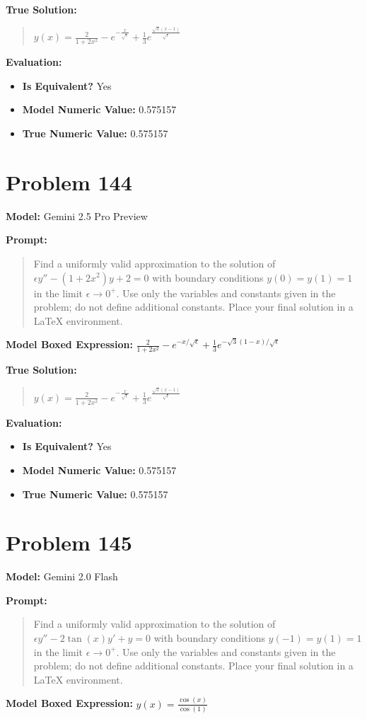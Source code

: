 \documentclass{article}
\begin{document}
{\textbf{True Solution:}
\begin{quote}
$y(x)=\frac{2}{1+2x^2}-e^{-\frac{x}{\sqrt{\epsilon}}}+\frac{1}{3}e^{\frac{\sqrt{3}(x-1)}{\sqrt{\epsilon}}}$
\end{quote}

\textbf{Evaluation:}
\begin{itemize}
\item \textbf{Is Equivalent?} Yes
\item \textbf{Model Numeric Value:} 0.575157
\item \textbf{True Numeric Value:} 0.575157
\end{itemize}
\vspace{1cm}
\section*{Problem 144}
\textbf{Model:} Gemini 2.5 Pro Preview

\textbf{Prompt:}
\begin{quote}
Find a uniformly valid approximation to the solution of $\epsilon y''-(1+2x^2)y+2=0$ with boundary conditions $y(0)=y(1)=1$ in the limit $\epsilon \to 0^+$. Use only the variables and constants given in the problem; do not define additional constants. Place your final solution in a $\boxed{}$ LaTeX environment.
\end{quote}
\textbf{Model Boxed Expression:} $\frac{2}{1+2x^2} - e^{-x/\sqrt{\epsilon}} + \frac{1}{3}e^{-\sqrt{3}(1-x)/\sqrt{\epsilon}}$

\textbf{True Solution:}
\begin{quote}
$y(x)=\frac{2}{1+2x^2}-e^{-\frac{x}{\sqrt{\epsilon}}}+\frac{1}{3}e^{\frac{\sqrt{3}(x-1)}{\sqrt{\epsilon}}}$
\end{quote}

\textbf{Evaluation:}
\begin{itemize}
\item \textbf{Is Equivalent?} Yes
\item \textbf{Model Numeric Value:} 0.575157
\item \textbf{True Numeric Value:} 0.575157
\end{itemize}
\vspace{1cm}
\section*{Problem 145}
\textbf{Model:} Gemini 2.0 Flash

\textbf{Prompt:}
\begin{quote}
Find a uniformly valid approximation to the solution of $\epsilon y'' - 2 \tan(x) y' + y = 0$ with boundary conditions $y(-1) = y(1) = 1$ in the limit $\epsilon \to 0^+$. Use only the variables and constants given in the problem; do not define additional constants. Place your final solution in a $\boxed{}$ LaTeX environment.
\end{quote}
\textbf{Model Boxed Expression:} $y(x) = \frac{\cos(x)}{\cos(1)}$

}
\end{document}
